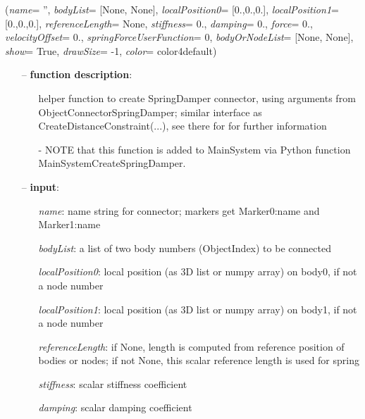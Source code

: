 %
\begin{flushleft}
\label{sec:mainsystemextensions:CreateSpringDamper}
({\it name}= '', {\it bodyList}= [None, None], {\it localPosition0}= [0.,0.,0.], {\it localPosition1}= [0.,0.,0.], {\it referenceLength}= None, {\it stiffness}= 0., {\it damping}= 0., {\it force}= 0., {\it velocityOffset}= 0., {\it springForceUserFunction}= 0, {\it bodyOrNodeList}= [None, None], {\it show}= True, {\it drawSize}= -1, {\it color}= color4default)
\end{flushleft}
\setlength{\itemindent}{0.7cm}
\begin{itemize}[leftmargin=0.7cm]
\item[--]
{\bf function description}: \vspace{-6pt}
\begin{itemize}[leftmargin=1.2cm]
\setlength{\itemindent}{-0.7cm}
\item[]helper function to create SpringDamper connector, using arguments from ObjectConnectorSpringDamper; similar interface as CreateDistanceConstraint(...), see there for for further information
\item[]- NOTE that this function is added to MainSystem via Python function MainSystemCreateSpringDamper.
\end{itemize}
\item[--]
{\bf input}: \vspace{-6pt}
\begin{itemize}[leftmargin=1.2cm]
\setlength{\itemindent}{-0.7cm}
\item[]{\it name}: name string for connector; markers get Marker0:name and Marker1:name
\item[]{\it bodyList}: a list of two body numbers (ObjectIndex) to be connected
\item[]{\it localPosition0}: local position (as 3D list or numpy array) on body0, if not a node number
\item[]{\it localPosition1}: local position (as 3D list or numpy array) on body1, if not a node number
\item[]{\it referenceLength}: if None, length is computed from reference position of bodies or nodes; if not None, this scalar reference length is used for spring
\item[]{\it stiffness}: scalar stiffness coefficient
\item[]{\it damping}: scalar damping coefficient

\end{itemize}
\end{itemize}
